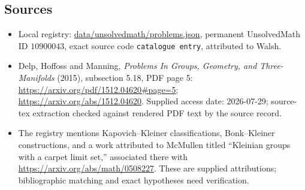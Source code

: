 \documentclass[11pt]{article}
\begin{document}
\subsection{Sources}
\begin{itemize}
\item Local registry: \url{data/unsolvedmath/problems.json}, permanent UnsolvedMath ID $10900043$, exact source code \texttt{catalogue entry}, attributed to Walsh.
\item Delp, Hoffoss and Manning, \emph{Problems In Groups, Geometry, and Three-Manifolds} (2015), subsection 5.18, PDF page 5: \url{https://arxiv.org/pdf/1512.04620#page=5}; \url{https://arxiv.org/abs/1512.04620}. Supplied access date: 2026-07-29; source-tex extraction checked against rendered PDF text by the source record.
\item The registry mentions Kapovich--Kleiner classifications, Bonk--Kleiner constructions, and a work attributed to McMullen titled ``Kleinian groups with a carpet limit set,'' associated there with \url{https://arxiv.org/abs/math/0508227}. These are supplied attributions; bibliographic matching and exact hypotheses need verification.
\end{itemize}
\end{document}
